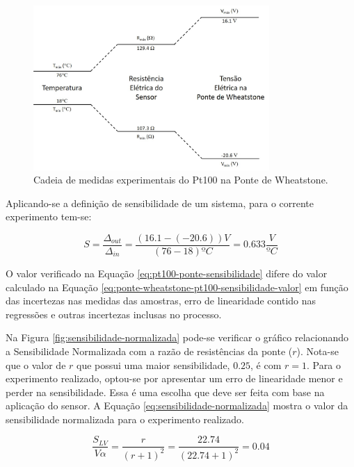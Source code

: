 \documentclass[a4paper]{instrumentacao}
\begin{document}
\begin{figure}[H]
\center
\includegraphics[width=0.8\textwidth]{cadeia_medidas_pt100_ponte.jpg}
\caption{Cadeia de medidas experimentais do Pt100 na Ponte de Wheatstone.}
\label{fig:pt100-cadeia-medidas-ponte}
\end{figure}

Aplicando-se a definição de sensibilidade de um sistema, para o corrente experimento tem-se:

\begin{equation}
	S=\frac{\Delta_{out}}{\Delta_{in}}=\frac{(16.1-(-20.6))V}{(76-18) ºC}=0.633 \frac{V}{ºC}
	\label{eq:pt100-ponte-sensibilidade}
\end{equation}

O valor verificado na Equação \ref{eq:pt100-ponte-sensibilidade} difere do valor calculado na Equação \ref{eq:ponte-wheatstone-pt100-sensibilidade-valor} em função das incertezas nas medidas das amostras, erro de linearidade contido nas regressões e outras incertezas inclusas no processo.

Na Figura \ref{fig:sensibilidade-normalizada} pode-se verificar o gráfico relacionando a Sensibilidade Normalizada com a razão de resistências da ponte ($r$). Nota-se que o valor de $r$ que possui uma maior sensibilidade, $0.25$, é com $r=1$. Para o experimento realizado, optou-se por apresentar um erro de linearidade menor e perder na sensibilidade. Essa é uma escolha que deve ser feita com base na aplicação do sensor. A Equação \ref{eq:sensibilidade-normalizada} mostra o valor da sensibilidade normalizada para o experimento realizado.

\begin{equation}
	\frac{S_{LV}}{V\alpha}=\frac{r}{(r+1)^2}=\frac{22.74}{(22.74+1)^2}=0.04
	\label{eq:sensibilidade-normalizada}
\end{equation}
\end{document}
